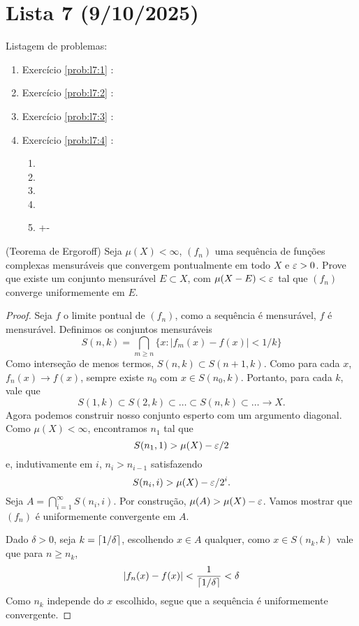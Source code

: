 \clearpage
\section{Lista 7 (9/10/2025)}

Listagem de problemas:
\begin{enumerate}
    \item Exercício \ref{prob:l7:1} : \checkmark
    \item Exercício \ref{prob:l7:2} : \checkmark
    \item Exercício \ref{prob:l7:3} : \checkmark
    \item Exercício \ref{prob:l7:4} :
        \begin{enumerate}[label=(\alph*)]
            \item \checkmark
            \item \checkmark
            \item \Frowny
            \item \Frowny
            \item +-
        \end{enumerate}
\end{enumerate}


\begin{problem}
    \label{prob:l7:1}
    (Teorema de Ergoroff) Seja $\mu(X) < \infty$, $(f_n)$ uma sequência de funções complexas mensuráveis que convergem pontualmente em todo $X$
    e $\varepsilon > 0$. Prove que existe um conjunto mensurável $E \subset X$, com $\mu(X - E) < \varepsilon$ tal que $(f_n)$ converge uniformemente em $E$.
\end{problem}
\begin{proof}
    Seja $f$ o limite pontual de $(f_n)$, como a sequência é mensurável, $f$ é mensurável.
    Definimos os conjuntos mensuráveis 
    $$S(n,k) = \bigcap_{m \geq n} \{x : |f_m(x) - f(x)| < 1/k\}$$
    Como interseção de menos termos, $S(n,k) \subset S(n+1,k)$. Como para cada $x$, $f_n(x) \to f(x)$, 
    sempre existe $n_0$ com $x \in S(n_0, k)$. Portanto, para cada $k$, vale que 
    $$S(1,k) \subset S(2,k) \subset \dots \subset S(n,k) \subset \dots \to X.$$
    Agora podemos construir nosso conjunto esperto com um argumento diagonal. Como $\mu(X) < \infty$, encontramos $n_1$
    tal que 
    $$S(n_1, 1) > \mu(X) - \varepsilon/2$$
    e, indutivamente em $i$, $n_{i} > n_{i-1}$ satisfazendo %
    $$S(n_i, i) > \mu(X) - \varepsilon/2^i.$$
    Seja $A = \bigcap_{i=1}^\infty S(n_i,i)$. Por construção, $\mu(A) > \mu(X) - \varepsilon$. Vamos mostrar que $(f_n)$ é uniformemente
    convergente em $A$. 
    
    Dado $\delta > 0$, seja $k = \lceil 1/\delta \rceil$,  escolhendo $x \in A$ qualquer, como $x \in S(n_k,k)$ vale que 
    para $n \geq n_k$, 
    $$|f_n(x) - f(x)| < \frac{1}{\lceil 1/\delta \rceil} < \delta$$
    Como $n_k$ independe do $x$ escolhido, segue que a sequência é uniformemente convergente. 
\end{proof}

